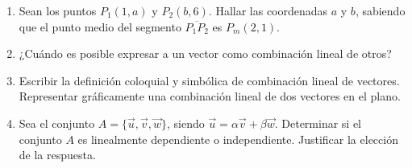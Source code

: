 \begin{enumerate}
    \item Sean los puntos $P_1(1,a)$ y $P_2(b,6)$. Hallar las coordenadas $a$ y $b$, sabiendo que el punto medio del segmento $\overline{P_1P_2}$ es $P_m(2,1)$.
    
    \item ¿Cuándo es posible expresar a un vector como combinación lineal de otros?
    
    \item Escribir la definición coloquial y simbólica de combinación lineal de vectores. Representar gráficamente una combinación lineal de dos vectores en el plano.
    
    \item Sea el conjunto $A=\{\vec{u},\vec{v},\vec{w}\}$, siendo $\vec{u}=\alpha\vec{v}+\beta\vec{w}$. Determinar si el conjunto $A$ es linealmente dependiente o independiente. Justificar la elección de la respuesta.
\end{enumerate}
